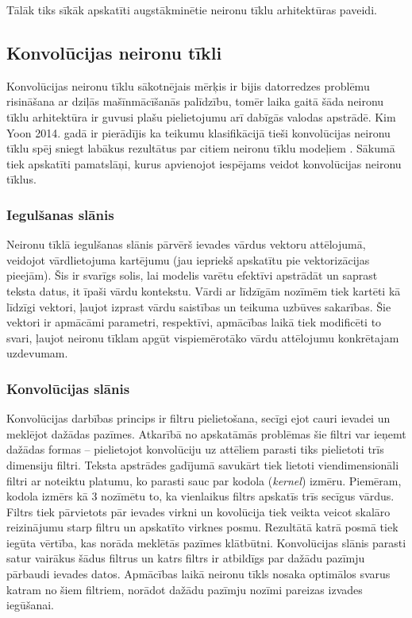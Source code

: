 Tālāk tiks sīkāk apskatīti augstākminētie neironu tīklu arhitektūras paveidi.
\subsection{Konvolūcijas neironu tīkli}
Konvolūcijas neironu tīklu sākotnējais mērķis ir bijis datorredzes problēmu risināšana ar dziļās mašīnmācīšanās palīdzību, tomēr laika gaitā šāda neironu tīklu arhitektūra ir guvusi plašu pielietojumu arī dabīgās valodas apstrādē. Kim Yoon 2014. gadā ir pierādījis ka teikumu klasifikācijā tieši konvolūcijas neironu tīklu spēj sniegt labākus rezultātus par citiem neironu tīklu modeļiem \cite{kimYoonCNN}. Sākumā tiek apskatīti pamatslāņi, kurus apvienojot iespējams veidot konvolūcijas neironu tīklus.

\subsubsection{Iegulšanas slānis}
Neironu tīklā iegulšanas slānis pārvērš ievades vārdus vektoru attēlojumā, veidojot vārdlietojuma kartējumu (jau iepriekš apskatītu pie vektorizācijas pieejām). Šis ir svarīgs solis, lai modelis varētu efektīvi apstrādāt un saprast teksta datus, it īpaši vārdu kontekstu. Vārdi ar līdzīgām nozīmēm tiek kartēti kā līdzīgi vektori, ļaujot izprast vārdu saistības un teikuma uzbūves sakarības. Šie vektori ir apmācāmi parametri, respektīvi, apmācības laikā tiek modificēti to svari, ļaujot neironu tīklam apgūt vispiemērotāko vārdu attēlojumu konkrētajam uzdevumam.

\subsubsection{Konvolūcijas slānis}
Konvolūcijas darbības princips ir filtru pielietošana, secīgi ejot cauri ievadei un meklējot dažādas pazīmes. Atkarībā no apskatāmās problēmas šie filtri var ieņemt dažādas  formas – pielietojot konvolūciju uz attēliem parasti tiks pielietoti trīs dimensiju filtri. Teksta apstrādes gadījumā savukārt tiek lietoti viendimensionāli filtri ar noteiktu platumu, ko parasti sauc par kodola (\textit{kernel}) izmēru. Piemēram, kodola izmērs kā 3 nozīmētu to, ka vienlaikus filtrs apskatīs trīs secīgus vārdus. Filtrs tiek pārvietots pār ievades virkni un kovolūcija tiek veikta veicot skalāro reizinājumu starp filtru un apskatīto virknes posmu. Rezultātā katrā posmā tiek iegūta vērtība, kas norāda meklētās pazīmes klātbūtni. Konvolūcijas slānis parasti satur vairākus šādus filtrus un katrs filtrs ir atbildīgs par dažādu pazīmju pārbaudi ievades datos. Apmācības laikā neironu tīkls nosaka optimālos svarus katram no šiem filtriem, norādot dažādu pazīmju nozīmi pareizas izvades iegūšanai.


